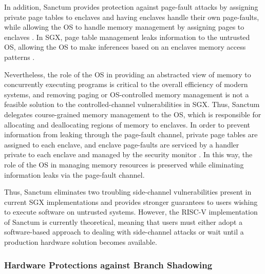 In addition, Sanctum provides protection against page-fault attacks by assigning private page tables to enclaves and having enclaves handle their own page-faults, while allowing the OS to handle memory management by assigning pages to enclaves \cite{costan_sanctum:_2016, costan_sanctum:_2015}. In SGX, page table management leaks information to the untrusted OS, allowing the OS to make inferences based on an enclaves memory access patterns \cite{costan_sanctum:_2016, costan_sanctum:_2015, costan_intel_2016}. 

Nevertheless, the role of the OS in providing an abstracted view of memory to concurrently executing programs is critical to the overall efficiency of modern systems, and removing paging or OS-controlled memory management is not a feasible solution to the controlled-channel vulnerabilities in SGX. Thus, Sanctum delegates course-grained memory management to the OS, which is responsible for allocating and deallocating regions of memory to enclaves. In order to prevent information from leaking through the page-fault channel, private page tables are assigned to each enclave, and enclave page-faults are serviced by a handler private to each enclave and managed by the security monitor \cite{costan_sanctum:_2016, costan_sanctum:_2015}. In this way, the role of the OS in managing memory resources is preserved while eliminating information leaks via the page-fault channel.

Thus, Sanctum eliminates two troubling side-channel vulnerabilities present in current SGX implementations and provides stronger guarantees to users wishing to execute software on untrusted systems. However, the RISC-V implementation of Sanctum is currently theoretical, meaning that users must either adopt a software-based approach to dealing with side-channel attacks or wait until a production hardware solution becomes available. 

\subsubsection{Hardware Protections against Branch Shadowing}

